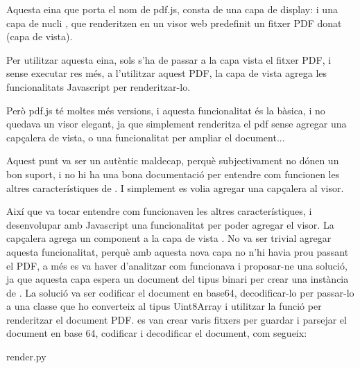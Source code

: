 \documentclass[letterpaper,11pt,catalan]{sphinxmanual}
\begin{document}
Aquesta eina que porta el nom de pdf.js, consta de una capa de display:  i una capa
de nucli , que renderitzen en un visor web predefinit un fitxer PDF donat (capa de vista).

Per utilitzar aquesta eina, sols s'ha de passar a la capa vista el fitxer PDF, i sense executar res més,
a l'utilitzar aquest PDF, la capa de vista agrega les funcionalitats Javascript per renderitzar-lo.

Però pdf.js té moltes més versions, i aquesta funcionalitat és la bàsica, i no quedava un visor elegant, ja
que simplement renderitza el pdf sense agregar una capçalera de vista, o una funcionalitat per ampliar el
document...

Aquest punt va ser un autèntic maldecap, perquè subjectivament no dónen un bon suport, i no hi ha una
bona documentació per entendre com funcionen les altres característiques de . I simplement
es volia agregar una capçalera al visor.

Així que va tocar entendre com funcionaven les altres característiques, i desenvolupar amb Javascript
una funcionalitat per poder agregar el visor.
La capçalera agrega un component a la capa de vista . No va ser trivial agregar aquesta
funcionalitat, perquè amb aquesta nova capa no n'hi havia prou passant el PDF, a més es va haver
d'analitzar com funcionava i proposar-ne una solució, ja que aquesta capa espera un document del tipus
binari per crear una instància de . La solució va ser codificar el document en base64,
decodificar-lo per passar-lo a una classe que ho converteix al tipus Uint8Array i utilitzar la funció 
per renderitzar el document PDF. es van crear varis fitxers per guardar i parsejar el document en base 64,
codificar i decodificar el document, com segueix:

render.py
\end{document}
